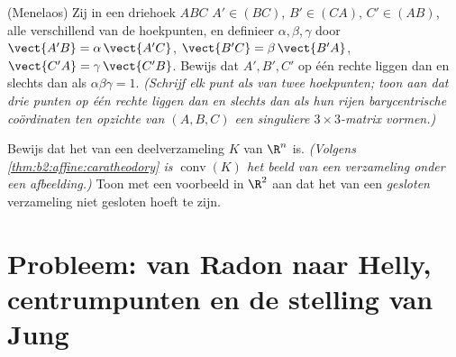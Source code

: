 \begin{exercise}[$\star\star$]\label{exo:b2:affine:11}
(Menelaos) Zij in een driehoek $ABC$ $A' \in (BC)$, $B' \in (CA)$,
$C' \in (AB)$, alle verschillend van de hoekpunten, en definieer
$\alpha, \beta, \gamma$ door $\vect{A'B} = \alpha\,\vect{A'C}$,
$\vect{B'C} = \beta\,\vect{B'A}$, $\vect{C'A} =
\gamma\,\vect{C'B}$. Bewijs dat $A', B', C'$ op één rechte liggen
dan en slechts dan als $\alpha\beta\gamma = 1$. \emph{(Schrijf elk
punt als  van twee hoekpunten; toon aan dat drie punten
op één rechte liggen dan en slechts dan als hun rijen
barycentrische coördinaten ten opzichte van $(A, B, C)$ een
singuliere $3 \times 3$-matrix vormen.)}
\end{exercise}

\begin{exercise}[$\star\star\star$]\label{exo:b2:affine:12}
Bewijs dat het  van een  deelverzameling
$K$ van $\R^n$  is. \emph{(Volgens
\cref{thm:b2:affine:caratheodory} is $\operatorname{conv}(K)$ het
beeld van een  verzameling onder een 
afbeelding.)} Toon met een voorbeeld in $\R^2$ aan dat het  van een \emph{gesloten} verzameling niet gesloten hoeft te
zijn.
\end{exercise}

\section{Probleem: van Radon naar Helly, centrumpunten en de
stelling van Jung}


